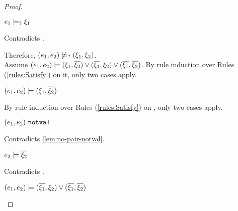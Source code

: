 \begin{proof}
\begin{byCases}
\begin{byCases}
\begin{byCases}
\begin{byCases}
\begin{pfsteps*}
                \item $e_1 \models_{?} \xi_1$ 
                \end{pfsteps*}
                Contradicts .
            \end{byCases}
            Therefore, $(e_1 , e_2) \not\models_{?} (\xi_1 , \xi_2)$.\\
            Assume $(e_1 , e_2) \models (\xi_1 , \overline{\xi_2}) \vee (\overline{\xi_1} , \xi_2) \vee (\overline{\xi_1} , \overline{\xi_2})$. By rule induction over Rules (\ref{rules:Satisfy}) on it, only two cases apply.
            \begin{byCases}
            \item[\text{(\ref{rule:CSOr1})}]
                \begin{pfsteps*}
                \item $(e_1 , e_2) \models (\xi_1 , \overline{\xi_2})$  
                \end{pfsteps*}
                By rule induction over Rules (\ref{rules:Satisfy}) on , only two cases apply.
                \begin{byCases}
                \item[\text{(\ref{rule:CSNotValPair})}]
                    \begin{pfsteps*}
                    \item $(e_1 , e_2) ~\mathtt{notval}$ 
                    \end{pfsteps*}
                    Contradicts \autoref{lem:no-pair-notval}.
                \item[\text{(\ref{rule:CSPair})}]
                    \begin{pfsteps*}
                    \item $e_2 \models \overline{\xi_2}$ 
                    \end{pfsteps*}
                    Contradicts .
                \end{byCases}
            \item[\text{(\ref{rule:CSOr2})}]
                \begin{pfsteps*}
                \item $(e_1 , e_2) \models (\overline{\xi_1} , \xi_2) \vee (\overline{\xi_1} , \overline{\xi_2})$  

\end{pfsteps*}
\end{byCases}
\end{byCases}
\end{byCases}
\end{byCases}
\end{proof}
